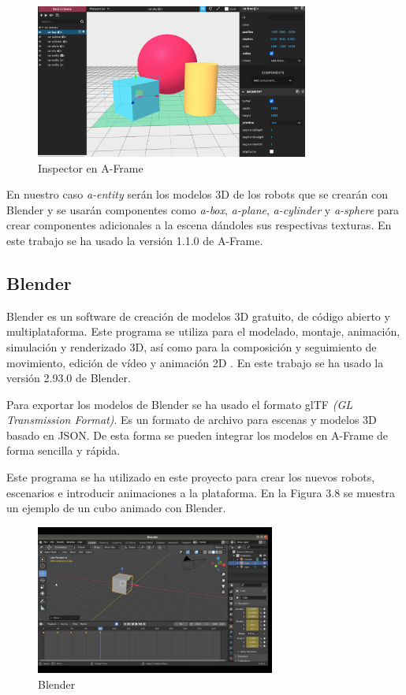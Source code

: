 \begin{figure}[H]
    \centering
    \includegraphics[width=0.8\textwidth, height=0.5\textwidth]{chapters/images/inspectoraframe.png}
    \caption{Inspector en A-Frame}
    \label{fig:my_label}
\end{figure}


En nuestro caso \textit{a-entity} serán los modelos 3D de los robots que se crearán con Blender  y se usarán componentes como \textit{a-box}, \textit{a-plane}, \textit{a-cylinder} y \textit{a-sphere} para crear componentes adicionales a la escena dándoles sus respectivas texturas. En este trabajo se ha usado la versión 1.1.0 de A-Frame.

\subsection{Blender}
Blender es un software de creación de modelos 3D gratuito, de código abierto y multiplataforma. Este programa se utiliza para el modelado, montaje, animación, simulación y renderizado 3D, así como para la  composición y seguimiento de movimiento, edición de vídeo y animación 2D
\cite{blender}. En este trabajo se ha usado la versión 2.93.0 de Blender.

Para exportar los modelos de Blender se ha usado el formato glTF \textit{(GL Transmission Format)}. Es un formato de archivo para escenas y modelos 3D basado en JSON. De esta forma se pueden integrar los modelos en A-Frame de forma sencilla y rápida.

Este programa se ha utilizado en este proyecto para crear los nuevos robots, escenarios e introducir animaciones a la plataforma. En la Figura 3.8 se muestra un ejemplo de un cubo animado con Blender. 

\begin{figure}[H]
    \centering
    \includegraphics[width=0.7\textwidth, height=0.4\textwidth]{chapters/images/blender.png}
    \caption{Blender}
    \label{fig:my_label}
\end{figure}

